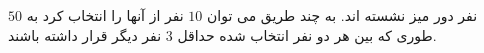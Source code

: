 \exercise
$50$
نفر دور میز نشسته اند. به چند طریق می توان 
$10$
 نفر از آنها  را انتخاب کرد به طوری که بین هر دو نفر انتخاب شده حداقل 
$3$
  نفر دیگر قرار داشته باشند.